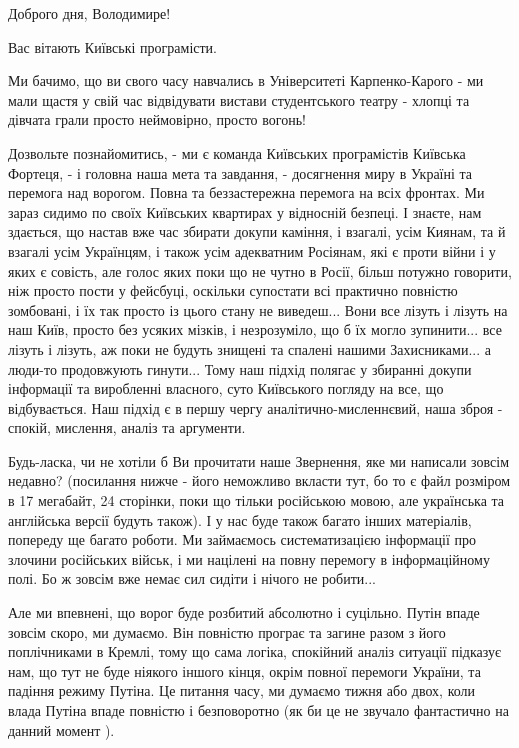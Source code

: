  
 
 
 
 

Доброго дня, Володимире!

Вас вітають Київські програмісти.

Ми бачимо, що ви свого часу навчались в Університеті Карпенко-Карого - 
ми мали щастя у свій час відвідувати вистави студентського театру - хлопці та
дівчата грали просто неймовірно, просто вогонь!

Дозвольте познайомитись, - ми є команда Київських програмістів Київська
Фортеця, - і головна наша мета та завдання, - досягнення миру в Україні та
перемога над ворогом.  Повна та беззастережна перемога на всіх фронтах. Ми
зараз сидимо по своїх Київських квартирах у відносній безпеці. І знаєте, нам
здається, що настав вже час збирати докупи каміння, і взагалі, усім Киянам, та
й взагалі усім Українцям, і також усім адекватним Росіянам, які є проти війни і
у яких є совість, але голос яких поки що не чутно в Росії, більш потужно
говорити, ніж просто пости у фейсбуці, оскільки супостати всі практично
повністю зомбовані, і їх так просто із цього стану не виведеш... Вони все
лізуть і лізуть на наш Київ, просто без усяких мізків, і незрозуміло, що б їх могло
зупинити... все лізуть і лізуть, аж поки не будуть знищені та спалені нашими
Захисниками... а люди-то продовжують гинути...  Тому наш підхід полягає у
збиранні докупи інформації та виробленні власного, суто Київського погляду на
все, що відбувається. Наш підхід є в першу чергу аналітично-мисленнєвий, наша
зброя - спокій, мислення, аналіз та аргументи.

Будь-ласка, чи не хотіли б Ви прочитати наше Звернення, яке ми написали зовсім
недавно?  (посилання нижче - його неможливо вкласти тут, бо то є файл розміром
в 17 мегабайт, 24 сторінки, поки що тільки російською мовою, але українська та
англійська версії будуть також). І у нас буде також багато інших матеріалів,
попереду ще багато роботи. Ми займаємось систематизацією інформації про злочини
російських військ, і ми націлені на повну перемогу в інформаційному полі. Бо ж
зовсім вже немає сил сидіти і нічого не робити...

Але ми впевнені, що ворог буде розбитий абсолютно і суцільно. Путін впаде
зовсім скоро, ми думаємо.  Він повністю програє та загине разом з його
поплічниками в Кремлі, тому що сама логіка, спокійний аналіз ситуації підказує
нам, що тут не буде ніякого іншого кінця, окрім повної перемоги України, та
падіння режиму Путіна. Це питання часу, ми думаємо тижня або двох, коли влада
Путіна впаде повністю і безповоротно (як би це не звучало фантастично на данний
момент ).

